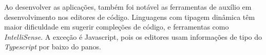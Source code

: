 Ao desenvolver as aplicações, também foi notável as ferramentas de auxílio em
desenvolvimento nos editores de código. Linguagens com tipagem dinâmica têm maior
dificuldade em sugerir compleções de código, e ferramentas como \textit{IntelliSense}.
A exceção é Javascript, pois os editores usam informações de tipo do \textit{Typescript}
por baixo do panos.

